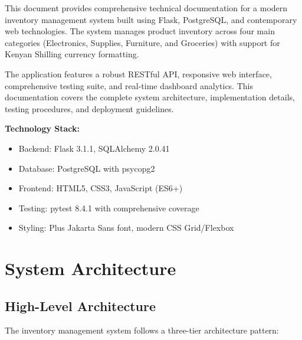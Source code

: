 \documentclass[12pt,a4paper]{article}
\begin{document}
This document provides comprehensive technical documentation for a modern inventory management system built using Flask, PostgreSQL, and contemporary web technologies. The system manages product inventory across four main categories (Electronics, Supplies, Furniture, and Groceries) with support for Kenyan Shilling currency formatting.

The application features a robust RESTful API, responsive web interface, comprehensive testing suite, and real-time dashboard analytics. This documentation covers the complete system architecture, implementation details, testing procedures, and deployment guidelines.

\begin{infobox}
\textbf{Technology Stack:}
\begin{itemize}
    \item Backend: Flask 3.1.1, SQLAlchemy 2.0.41
    \item Database: PostgreSQL with psycopg2
    \item Frontend: HTML5, CSS3, JavaScript (ES6+)
    \item Testing: pytest 8.4.1 with comprehensive coverage
    \item Styling: Plus Jakarta Sans font, modern CSS Grid/Flexbox
\end{itemize}
\end{infobox}

\section{System Architecture}

\subsection{High-Level Architecture}

The inventory management system follows a three-tier architecture pattern:
\end{document}
